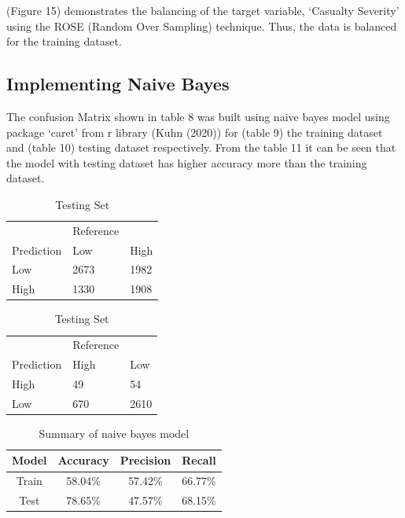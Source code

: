 \documentclass[
  a4paper,
]{article}
\begin{document}
(Figure 15) demonstrates the balancing of the target variable, `Casualty
Severity' using the ROSE (Random Over Sampling) technique. Thus, the
data is balanced for the training dataset.

\hypertarget{implementing-naive-bayes}{%
\subsection{Implementing Naive Bayes}\label{implementing-naive-bayes}}

The confusion Matrix shown in table 8 was built using naive bayes model
using package `caret' from r library (Kuhn (2020)) for (table 9) the
training dataset and (table 10) testing dataset respectively. From the
table 11 it can be seen that the model with testing dataset has higher
accuracy more than the training dataset.

\begin{table}[!htb]
    \caption{Confusion matrix of naive bayes model}
    \begin{minipage}{.5\linewidth}
      \caption{Training Set}
      \centering
        \begin{tabular}{lll}
        & Reference & \\
         Prediction  & Low & High\\
           Low & 2673 & 1982 \\
          High & 1330 & 1908  \\
        \end{tabular}
    \end{minipage}%
    \begin{minipage}{.5\linewidth}
      \centering
        \caption{Testing Set}
        \begin{tabular}{lll}
          & Reference & \\
          Prediction  & High & Low \\
           High & 49 & 54 \\
            Low & 670 & 2610\\
        \end{tabular}
    \end{minipage} 
\end{table}

\begin{table}[ht]
\caption{Summary of naive bayes model} 
\centering
\begin{tabular}{c@{\hskip 0.5in}c@{\hskip 0.5in}c@{\hskip 0.5in}c@{\hskip 0.5in}}
\hline\hline
Model & Accuracy & Precision & Recall \\ [0.5ex]
\hline
Train & 58.04\% & 57.42\% & 66.77\% \\ 
Test & 78.65\% & 47.57\% & 68.15\% \\[1ex]
\hline
\end{tabular}
\end{table}
\end{document}

